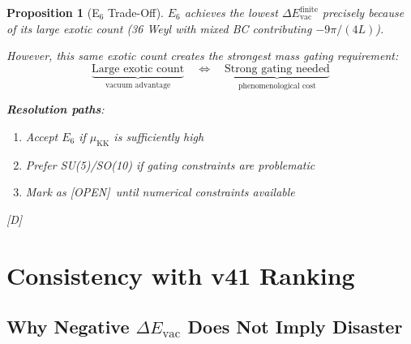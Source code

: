 \documentclass[11pt,a4paper]{article}
\newtheorem{proposition}[theorem]{Proposition}
\newcommand{\tagD}{\textcolor{blue!70!black}{[D]}}
\newcommand{\tagOPEN}{\textcolor{red!70!black}{[OPEN]}}
\begin{document}
\begin{proposition}[E$_6$ Trade-Off]
\label{prop:e6-tradeoff}
$E_6$ achieves the lowest $\Delta E_{\text{vac}}^{\text{finite}}$ precisely because of its large exotic count (36 Weyl with mixed BC contributing $-9\pi/(4L)$).

However, this same exotic count creates the strongest mass gating requirement:
\begin{equation}
\label{eq:e6-tradeoff}
\underbrace{\text{Large exotic count}}_{\text{vacuum advantage}} \quad \Leftrightarrow \quad \underbrace{\text{Strong gating needed}}_{\text{phenomenological cost}}
\end{equation}

\textbf{Resolution paths}:
\begin{enumerate}
    \item Accept $E_6$ if $\mu_{\text{KK}}$ is sufficiently high
    \item Prefer SU(5)/SO(10) if gating constraints are problematic
    \item Mark as \tagOPEN\ until numerical constraints available
\end{enumerate}
\tagD
\end{proposition}

\section{Consistency with v41 Ranking}
\label{sec:v41-consistency}

\subsection{Why Negative $\Delta E_{\text{vac}}$ Does Not Imply Disaster}
\end{document}
